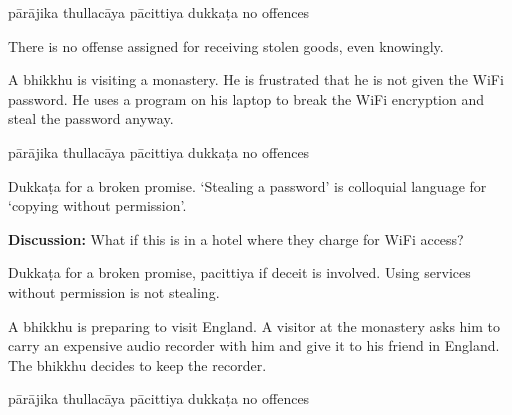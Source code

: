 \begin{exam}{\autoExamName}
\begin{problem*}
\begin{parts}
  \bigskip

  \begin{answers}{5}
    \bChoices
     pārājika\eAns
     thullacāya\eAns
     pācittiya\eAns
     dukkaṭa\eAns
     no offences\eAns
    \eChoices
  \end{answers}

  \begin{solution}
    There is no offense assigned for receiving stolen goods, even knowingly.
  \end{solution}

  \bigskip

  \item A bhikkhu is visiting a monastery. He is frustrated that he is not given
    the WiFi password. He uses a program on his laptop to break the WiFi encryption
    and steal the password anyway.

  \bigskip

  \begin{answers}{5}
    \bChoices
     pārājika\eAns
     thullacāya\eAns
     pācittiya\eAns
     dukkaṭa\eAns
     no offences\eAns
    \eChoices
  \end{answers}

  \begin{solution}
    Dukkaṭa for a broken promise. `Stealing a password' is colloquial language
    for `copying without permission'.
  \end{solution}

  \bigskip

  \textbf{Discussion:} What if this is in a hotel where they charge for WiFi access?

  \begin{solution}
    Dukkaṭa for a broken promise, pacittiya if deceit is involved. Using services without permission is not stealing.
  \end{solution}

  \bigskip

  \item A bhikkhu is preparing to visit England. A visitor at the monastery asks
    him to carry an expensive audio recorder with him and give it to his friend in
    England. The bhikkhu decides to keep the recorder.

  \bigskip

  \begin{answers}{5}
    \bChoices
     pārājika\eAns
     thullacāya\eAns
     pācittiya\eAns
     dukkaṭa\eAns
     no offences\eAns
    \eChoices
  \end{answers}


\end{parts}
\end{problem*}
\end{exam}

